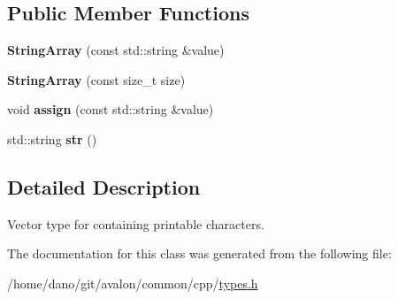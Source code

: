 \subsection*{Public Member Functions}
\begin{DoxyCompactItemize}
\item 
\mbox{\label{classStringArray_aca388ce165edd07c5504f0ffea9aafd4}} 
{\bfseries String\+Array} (const std\+::string \&value)
\item 
\mbox{\label{classStringArray_af24b35bd7b1cf63e71a555f210906987}} 
{\bfseries String\+Array} (const size\+\_\+t size)
\item 
\mbox{\label{classStringArray_a8a2c70a583948c82fdc0ae1f1351d7f0}} 
void {\bfseries assign} (const std\+::string \&value)
\item 
\mbox{\label{classStringArray_a2ba7f17ac2d154721d38881e2e141ba5}} 
std\+::string {\bfseries str} ()
\end{DoxyCompactItemize}


\subsection{Detailed Description}
Vector type for containing printable characters. 

The documentation for this class was generated from the following file\+:\begin{DoxyCompactItemize}
\item 
/home/dano/git/avalon/common/cpp/\hyperlink{types_8h}{types.\+h}\end{DoxyCompactItemize}
